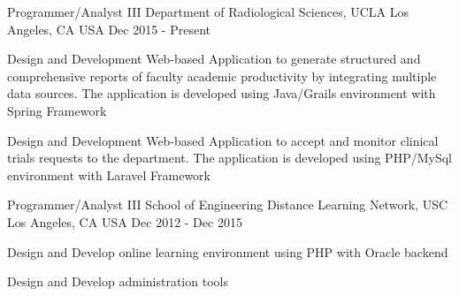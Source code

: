 


\begin{cventries}

 
  \cventry
    {Programmer/Analyst III} %
    {Department of Radiological Sciences, UCLA} %
    {Los Angeles, CA USA} %
    {Dec 2015 - Present} %
    {
      \begin{cvitems} %
        \item {Design and Development Web-based Application to generate structured and comprehensive reports of faculty academic productivity by integrating multiple data sources. The application is developed using Java/Grails environment with Spring Framework}
        \item {Design and Development Web-based Application to accept and monitor clinical trials requests to the department. The application is developed using PHP/MySql environment with Laravel Framework}       
      \end{cvitems}
    }
	
  \cventry
    {Programmer/Analyst III} %
    {School of Engineering Distance Learning Network, USC} %
    {Los Angeles, CA USA} %
    {Dec 2012 - Dec 2015} %
    {
      \begin{cvitems} %
        \item {Design and Develop online learning environment using PHP with Oracle backend}
        \item {Design and Develop administration tools }       
      \end{cvitems}
    }


\end{cventries}
